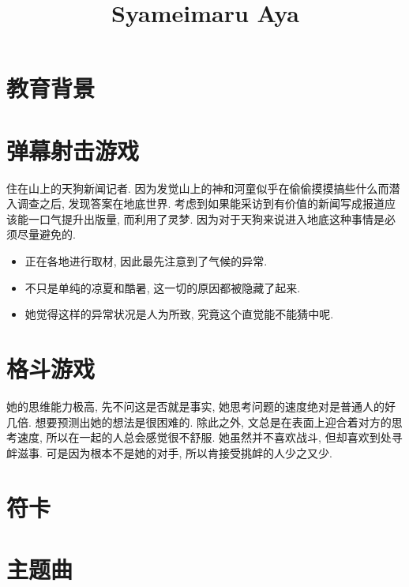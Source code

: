 \documentclass[11pt,a4paper,roman]{ayacv}
\title{Syameimaru Aya}
\begin{document}
\makecvtitle

\section{教育背景}

\section{弹幕射击游戏}
{
    住在山上的天狗新闻记者. 
    因为发觉山上的神和河童似乎在偷偷摸摸搞些什么而潜入调查之后, 发现答案在地底世界. 
    考虑到如果能采访到有价值的新闻写成报道应该能一口气提升出版量, 而利用了灵梦. 
    因为对于天狗来说进入地底这种事情是必须尽量避免的. 
}
{
    \begin{itemize}
        \item 正在各地进行取材, 因此最先注意到了气候的异常. 
        \item 不只是单纯的凉夏和酷暑, 这一切的原因都被隐藏了起来. 
        \item 她觉得这样的异常状况是人为所致, 究竟这个直觉能不能猜中呢. 
    \end{itemize}
}

\section{格斗游戏}
{
    她的思维能力极高, 先不问这是否就是事实, 她思考问题的速度绝对是普通人的好几倍. 
    想要预测出她的想法是很困难的. 
    除此之外, 文总是在表面上迎合着对方的思考速度, 所以在一起的人总会感觉很不舒服. 
    她虽然并不喜欢战斗, 但却喜欢到处寻衅滋事. 
    可是因为根本不是她的对手, 所以肯接受挑衅的人少之又少. 
}

\section{符卡}

\section{主题曲}
\end{document}
